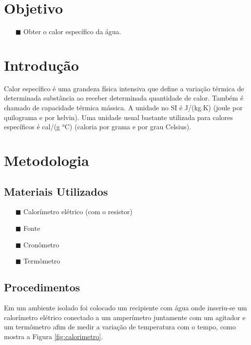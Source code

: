 \section{Objetivo}

\begin{itemize}
    \item[$\blacksquare$] Obter o calor específico da água.
\end{itemize}

\section{Introdução}

Calor específico é uma grandeza física intensiva que define a variação térmica de determinada substância ao receber determinada quantidade de calor. Também é chamado de capacidade térmica mássica. A unidade no SI é J/(kg.K) (joule por quilograma e por kelvin). Uma unidade usual bastante utilizada para calores específicos é cal/(g °C) (caloria por grama e por grau Celsius). \cite{wiki:calor}

\section{Metodologia}



\subsection{Materiais Utilizados}

\begin{itemize}
    \item[$\blacksquare$] Calorímetro elétrico (com o resistor)
    \item[$\blacksquare$] Fonte
    \item[$\blacksquare$] Cronômetro
    \item[$\blacksquare$] Termômetro
\end{itemize}

\subsection{Procedimentos}

Em um ambiente isolado foi colocado um recipiente com água onde inseriu-se um calorímetro elétrico conectado a um amperímetro juntamente com um agitador e um termômetro afim de medir a variação de temperatura com o tempo, como mostra a Figura \ref{fig:calorimetro}.

